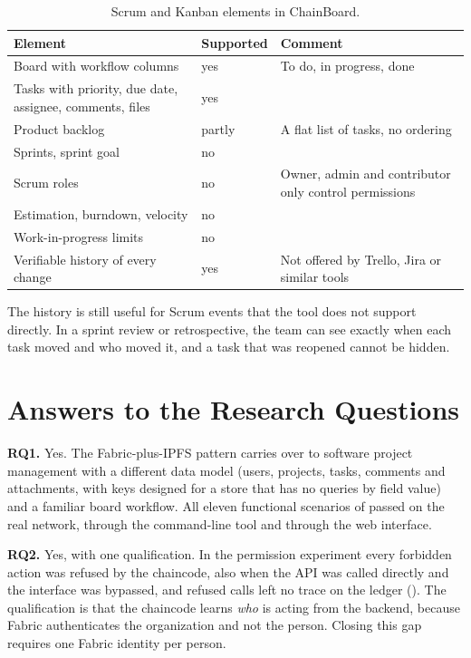 \begin{table}[htbp]
    \centering
    \small
    \begin{tabular}{p{4.4cm}p{1.6cm}p{6.0cm}}
        \toprule
        Element & Supported & Comment \\
        \midrule
        Board with workflow columns & yes & To do, in progress, done \\
        Tasks with priority, due date, assignee, comments, files & yes & \\
        Product backlog & partly & A flat list of tasks, no ordering \\
        Sprints, sprint goal & no & \\
        Scrum roles & no & Owner, admin and contributor only control permissions \\
        Estimation, burndown, velocity & no & \\
        Work-in-progress limits & no & \\
        Verifiable history of every change & yes & Not offered by Trello, Jira or similar tools \\
        \bottomrule
    \end{tabular}
    \caption{Scrum and Kanban elements in ChainBoard.}
    \label{tab:agile}
\end{table}

The history is still useful for Scrum events that the tool does not support directly. In a sprint review or retrospective, the team can see exactly when each task moved and who moved it, and a task that was reopened cannot be hidden.

\section{Answers to the Research Questions}
\label{sec:rq-answers}

\textbf{RQ1.} Yes. The Fabric-plus-IPFS pattern carries over to software project management with a different data model (users, projects, tasks, comments and attachments, with keys designed for a store that has no queries by field value) and a familiar board workflow. All eleven functional scenarios of  passed on the real network, through the command-line tool and through the web interface.

\textbf{RQ2.} Yes, with one qualification. In the permission experiment every forbidden action was refused by the chaincode, also when the API was called directly and the interface was bypassed, and refused calls left no trace on the ledger (). The qualification is that the chaincode learns \emph{who} is acting from the backend, because Fabric authenticates the organization and not the person. Closing this gap requires one Fabric identity per person.

